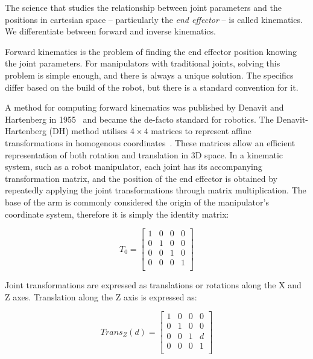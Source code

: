 The science that studies the relationship between joint parameters and the positions in cartesian space -- particularly the \textit{end effector} -- is called kinematics.
We differentiate between forward and inverse kinematics.

Forward kinematics is the problem of finding the end effector position knowing the joint parameters. For manipulators with traditional joints, solving this problem is simple enough, and there is always a unique solution. The specifics differ based on the build of the robot, but there is a standard convention for it.

A method for computing forward kinematics was published by Denavit and Hartenberg in 1955~\cite{dh} and became the de-facto standard for robotics. The Denavit-Hartenberg (DH) method utilises $4\times4$ matrices to represent affine transformations in homogenous coordinates~\cite{nomizu1994affine}.
These matrices allow an efficient representation of both rotation and translation in 3D space.
In a kinematic system, such as a robot manipulator, each joint has its accompanying transformation matrix, and the position of the end effector is obtained by repeatedly applying the joint transformations through matrix multiplication. The base of the arm is commonly considered the origin of the manipulator's coordinate system, therefore it is simply the identity matrix:

\begin{equation}
  T_0 =  \begin{bmatrix}
            1 & 0 & 0 & 0 \\ 0 & 1 & 0 & 0 \\ 0 & 0 & 1 & 0 \\ 0 & 0 & 0 & 1 \\
          \end{bmatrix}
\end{equation}

Joint transformations are expressed as translations or rotations along the X and Z axes.
Translation along the Z axis is expressed as:

\begin{equation}
  Trans_Z(d) = \begin{bmatrix}
                 1 & 0 & 0 & 0 \\ 0 & 1 & 0 & 0 \\ 0 & 0 & 1 & d \\ 0 & 0 & 0 & 1 \\
               \end{bmatrix}
\end{equation}


